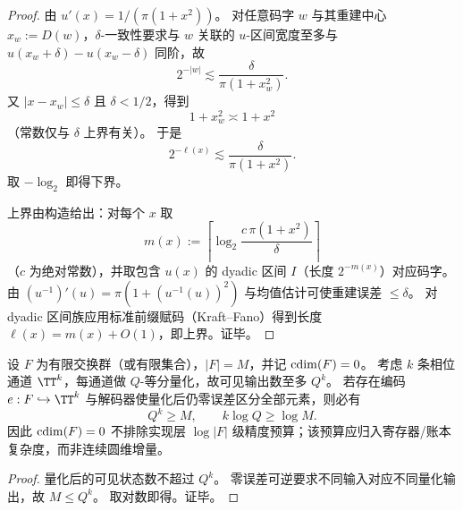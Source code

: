 \begin{proof}
由 \(u'(x)=1/(\pi(1+x^2))\)。
对任意码字 \(w\) 与其重建中心 \(x_w:=D(w)\)，\(\delta\)-一致性要求与 \(w\) 关联的 \(u\)-区间宽度至多与
\(
u(x_w+\delta)-u(x_w-\delta)
\)
同阶，故
\[
2^{-|w|}
\lesssim
\frac{\delta}{\pi(1+x_w^2)}.
\]
又 \(|x-x_w|\le\delta\) 且 \(\delta<1/2\)，得到
\[
1+x_w^2\asymp 1+x^2
\]
（常数仅与 \(\delta\) 上界有关）。
于是
\[
2^{-\ell(x)}
\lesssim
\frac{\delta}{\pi(1+x^2)}.
\]
取 \(-\log_2\) 即得下界。

上界由构造给出：对每个 \(x\) 取
\[
m(x):=\left\lceil \log_2\!\frac{c\,\pi(1+x^2)}{\delta}\right\rceil
\]
（\(c\) 为绝对常数），并取包含 \(u(x)\) 的 dyadic 区间 \(I\)（长度 \(2^{-m(x)}\)）对应码字。
由 \((u^{-1})'(u)=\pi(1+(u^{-1}(u))^2)\) 与均值估计可使重建误差 \(\le\delta\)。
对 dyadic 区间族应用标准前缀赋码（Kraft--Fano）得到长度 \(\ell(x)=m(x)+O(1)\)，即上界。证毕。
\end{proof}

\begin{theorem}\label{thm:cdim-zero-dimension-finite-phase-implementation-budget}
设 \(F\) 为有限交换群（或有限集合），\(|F|=M\)，并记 \(\operatorname{cdim}(F)=0\)。
考虑 \(k\) 条相位通道 \(\TT^k\)，每通道做 \(Q\)-等分量化，故可见输出数至多 \(Q^k\)。
若存在编码 \(e:F\hookrightarrow \TT^k\) 与解码器使量化后仍零误差区分全部元素，则必有
\[
Q^k\ge M,
\qquad
k\log Q\ge \log M.
\]
因此 \(\operatorname{cdim}(F)=0\) 不排除实现层 \(\log|F|\) 级精度预算；该预算应归入寄存器/账本复杂度，而非连续圆维增量。
\end{theorem}

\begin{proof}
量化后的可见状态数不超过 \(Q^k\)。
零误差可逆要求不同输入对应不同量化输出，故 \(M\le Q^k\)。
取对数即得。证毕。
\end{proof}

